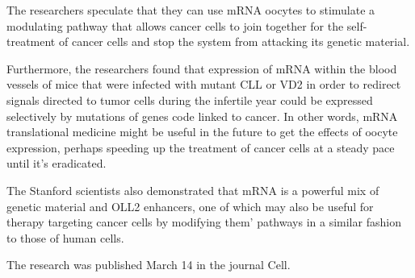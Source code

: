 \documentclass{article}
\begin{document}
The researchers speculate that they can use mRNA oocytes to stimulate a modulating pathway that allows cancer cells to join together for the self-treatment of cancer cells and stop the system from attacking its genetic material.

Furthermore, the researchers found that expression of mRNA within the blood vessels of mice that were infected with mutant CLL or VD2 in order to redirect signals directed to tumor cells during the infertile year could be expressed selectively by mutations of genes code linked to cancer. In other words, mRNA translational medicine might be useful in the future to get the effects of oocyte expression, perhaps speeding up the treatment of cancer cells at a steady pace until it’s eradicated.

The Stanford scientists also demonstrated that mRNA is a powerful mix of genetic material and OLL2 enhancers, one of which may also be useful for therapy targeting cancer cells by modifying them’ pathways in a similar fashion to those of human cells.

The research was published March 14 in the journal Cell.
\end{document}
